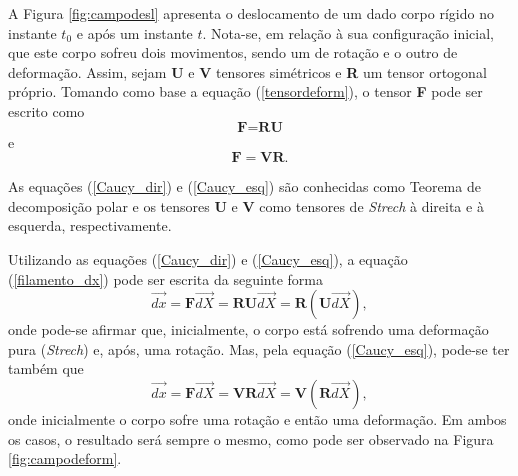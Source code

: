 

A Figura \ref{fig:campodesl} apresenta o deslocamento de um dado corpo rígido no instante $ t_{0} $ e após um instante $ t $. Nota-se, em relação à sua configuração inicial, que este corpo sofreu dois movimentos, sendo um de rotação e o outro de deformação. Assim, sejam \textbf{U} e \textbf{V} tensores simétricos e \textbf{R} um tensor ortogonal próprio. Tomando como base a equação (\ref{tensordeform}), o tensor \textbf{F} pode ser escrito como
\begin{equation} \label{Caucy_dir}
	\textbf{F} = \textbf{R} \textbf{U}
\end{equation}    
e
\begin{equation} \label{Caucy_esq}
	\textbf{F} = \textbf{V} \textbf{R}.
\end{equation}



As equações (\ref{Caucy_dir}) e (\ref{Caucy_esq}) são conhecidas como Teorema de decomposição polar e os tensores \textbf{U} e \textbf{V} como tensores de \textit{Strech} à direita e à esquerda, respectivamente.

Utilizando as equações (\ref{Caucy_dir}) e (\ref{Caucy_esq}), a equação (\ref{filamento_dx}) pode ser escrita da seguinte forma
\begin{equation}
	\vec{dx} =  \textbf{F} \vec{dX} = \textbf{R} \textbf{U} \vec{dX} = \textbf{R} ( \textbf{U} \vec{dX}),
\end{equation}
onde pode-se afirmar que, inicialmente, o corpo está sofrendo uma deformação pura (\textit{Strech}) e, após, uma rotação. Mas, pela equação (\ref{Caucy_esq}), pode-se ter também que
\begin{equation}
	\vec{dx} =  \textbf{F} \vec{dX} = \textbf{V} \textbf{R} \vec{dX} = \textbf{V} ( \textbf{R} \vec{dX}),
\end{equation}
onde inicialmente o corpo sofre uma rotação e então uma deformação. Em ambos os casos, o resultado será sempre o mesmo, como pode ser observado na Figura \ref{fig:campodeform}.

